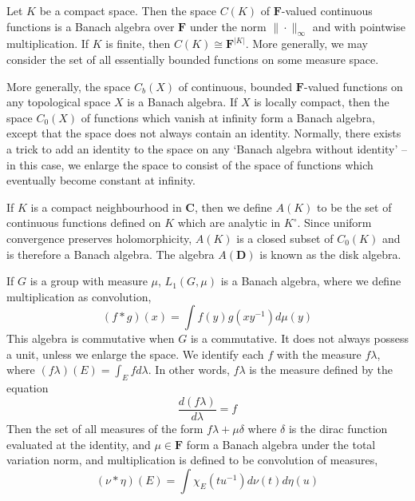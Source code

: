 \begin{example}
    Let $K$ be a compact space. Then the space $C(K)$ of $\mathbf{F}$-valued continuous functions is a Banach algebra over $\mathbf{F}$ under the norm $\| \cdot \|_\infty$ and with pointwise multiplication. If $K$ is finite, then $C(K) \cong \mathbf{F}^{|K|}$. More generally, we may consider the set of all essentially bounded functions on some measure space.
\end{example}

\begin{example}
    More generally, the space $C_b(X)$ of continuous, bounded $\mathbf{F}$-valued functions on any topological space $X$ is a Banach algebra. If $X$ is locally compact, then the space $C_0(X)$ of functions which vanish at infinity form a Banach algebra, except that the space does not always contain an identity. Normally, there exists a trick to add an identity to the space on any `Banach algebra without identity' -- in this case, we enlarge the space to consist of the space of functions which eventually become constant at infinity.
\end{example}

\begin{example}
    If $K$ is a compact neighbourhood in $\mathbf{C}$, then we define $A(K)$ to be the set of continuous functions defined on $K$ which are analytic in $K^\circ$. Since uniform convergence preserves holomorphicity, $A(K)$ is a closed subset of $C_0(K)$ and is therefore a Banach algebra. The algebra $A(\mathbf{D})$ is known as the disk algebra.
\end{example}

\begin{example}
    If $G$ is a group with measure $\mu$, $L_1(G, \mu)$ is a Banach algebra, where we define multiplication as convolution,
    \[ (f * g)(x) = \int f(y) g(xy^{-1}) d\mu(y) \]
    This algebra is commutative when $G$ is a commutative. It does not always possess a unit, unless we enlarge the space. We identify each $f$ with the measure $f \lambda$, where $(f \lambda) (E) = \int_E f d\lambda$. In other words, $f \lambda$ is the measure defined by the equation
    \[ \frac{d(f \lambda)}{d \lambda} = f \]
    Then the set of all measures of the form $f \lambda + \mu \delta$ where $\delta$ is the dirac function evaluated at the identity, and $\mu \in \mathbf{F}$ form a Banach algebra under the total variation norm, and multiplication is defined to be convolution of measures,
    \[ (\nu * \eta)(E) = \int \chi_E (tu^{-1}) d \nu(t) d\eta(u) \]
\end{example}


